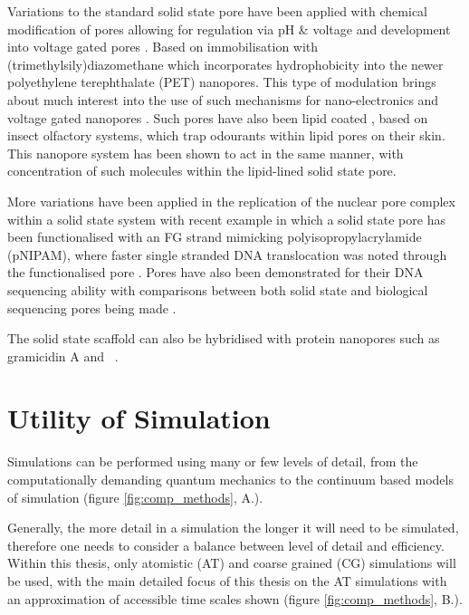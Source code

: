 Variations to the standard solid state pore have been applied with chemical modification of pores allowing for regulation via pH \& voltage \cite{Wanunu2007} and development into voltage gated pores \cite{Siwy2006}. Based on immobilisation with (trimethylsily)diazomethane \cite{Powell2011} which incorporates hydrophobicity into the newer polyethylene terephthalate (PET) nanopores. This type of modulation brings about much interest into the use of such mechanisms for nano-electronics and voltage gated nanopores \cite{Smirnov2011}. Such pores have also been lipid coated \cite{Yusko2011a}, based on insect olfactory systems, which trap odourants within lipid pores on their skin. This nanopore system has been shown to act in the same manner, with concentration of such molecules within the lipid-lined solid state pore. 

More variations have been applied in the replication of the nuclear pore complex within a solid state system \cite{Jovano2014,Kowalczyk2011} with recent example in which a solid state pore has been functionalised with an FG strand mimicking polyisopropylacrylamide (pNIPAM),  where faster single stranded DNA translocation was noted through the functionalised pore \cite{Jovano2014}. Pores have also been demonstrated for their DNA sequencing ability \cite{Schneider2010} with comparisons between both solid state and biological sequencing pores being made \cite{Haque2013}.

The solid state scaffold can also be hybridised with protein nanopores such as gramicidin A \cite{Balme2010} and \ahl\ \cite{Hall2010}. 

\section{Utility of Simulation}

Simulations can be performed using many or few levels of detail, from the computationally demanding quantum mechanics to the continuum based models of simulation (figure \ref{fig:comp_methods}, A.). 

Generally, the more detail in a simulation the longer it will need to be simulated, therefore one needs to consider a balance between level of detail and efficiency. Within this thesis, only atomistic (AT) and coarse grained (CG) simulations will be used, with the main detailed focus of this thesis on the AT simulations with an approximation of accessible time scales shown (figure \ref{fig:comp_methods}, B.). 

